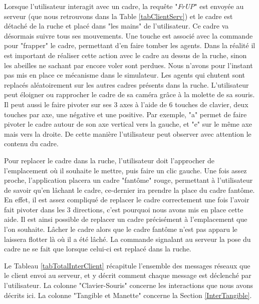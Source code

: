 		Lorsque l'utilisateur interagit avec un cadre, la requête "\textit{FrUP}" est envoyée au serveur (que nous retrouvons dans la Table \ref{tabClientServ}) et le cadre est détaché de la ruche et placé dans "les mains" de l'utilisateur. Ce cadre va désormais suivre tous ses mouvements. Une touche est associé avec la commande pour "frapper" le cadre, permettant d'en faire tomber les agents. Dans la réalité il est important de réaliser cette action avec le cadre au dessus de la ruche, sinon les abeilles ne sachant par encore voler sont perdues. Nous n'avons pour l'instant pas mis en place ce mécanisme dans le simulateur. Les agents qui chutent sont replacés aléatoirement sur les autres cadres présents dans la ruche.
		L'utilisateur peut éloigner ou rapprocher le cadre de sa caméra grâce à la molette de sa souris. Il peut aussi le faire pivoter sur ses 3 axes à l'aide de 6 touches de clavier, deux touches par axe, une négative et une positive. Par exemple, "a" permet de faire pivoter le cadre autour de son axe vertical vers la gauche, et "e" sur le même axe mais vers la droite. De cette manière l'utilisateur peut observer avec attention le contenu du cadre.
		
		Pour replacer le cadre dans la ruche, l'utilisateur doit l'approcher de l'emplacement où il souhaite le mettre, puis faire un clic gauche. Une fois assez proche, l'application placera un cadre "fantôme" rouge, permettant à l'utilisateur de savoir qu'en lâchant le cadre, ce-dernier ira prendre la place du cadre fantôme. En effet, il est assez compliqué de replacer le cadre correctement une fois l'avoir fait pivoter dans les 3 directions, c'est pourquoi nous avons mis en place cette aide. Il est ainsi possible de replacer un cadre précisément à l'emplacement que l'on souhaite. Lâcher le cadre alors que le cadre fantôme n'est pas apparu le laissera flotter là où il a été lâché. La commande signalant au serveur la pose du cadre ne se fait que lorsque celui-ci est replacé dans la ruche.
		
		 Le Tableau \ref{tabTotalInterClient} récapitule l'ensemble des messages réseaux que le client envoi au serveur, et y décrit comment chaque message est déclenché par l'utilisateur. La colonne "Clavier-Souris" concerne les interactions que nous avons décrits ici. La colonne "Tangible et Manette" concerne la Section \ref{InterTangible}.
	
